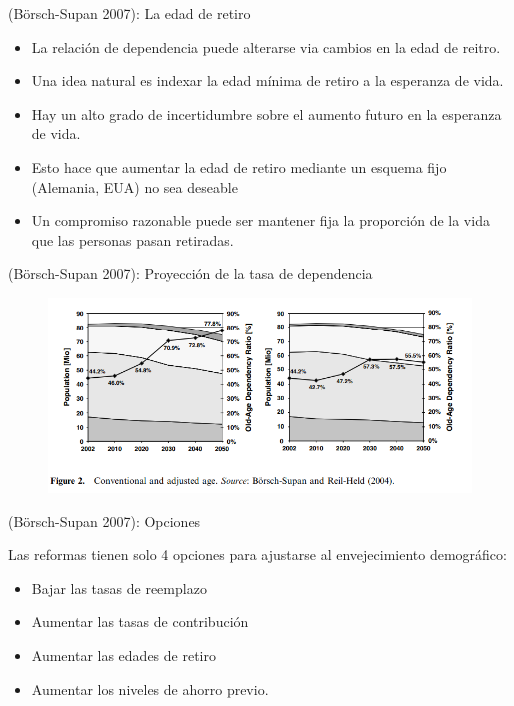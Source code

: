 \documentclass[ignorenonframetext,]{beamer}
\providecommand{\tightlist}{%
  \setlength{\itemsep}{0pt}\setlength{\parskip}{0pt}}
\begin{document}
\begin{frame}{(Börsch-Supan 2007): La edad de retiro}

\begin{itemize}
\item
  La relación de dependencia puede alterarse via cambios en la edad de
  reitro.
\item
  Una idea natural es indexar la edad mínima de retiro a la esperanza de
  vida.
\item
  Hay un alto grado de incertidumbre sobre el aumento futuro en la
  esperanza de vida.
\item
  Esto hace que aumentar la edad de retiro mediante un esquema fijo
  (Alemania, EUA) no sea deseable
\item
  Un compromiso razonable puede ser mantener fija la proporción de la
  vida que las personas pasan retiradas.
\end{itemize}

\end{frame}

\begin{frame}{(Börsch-Supan 2007): Proyección de la tasa de dependencia}

\begin{figure}
\centering
\includegraphics{imgs_reforma/borsch.png}
\caption{}
\end{figure}

\end{frame}

\begin{frame}{(Börsch-Supan 2007): Opciones}

Las reformas tienen solo 4 opciones para ajustarse al envejecimiento
demográfico:

\begin{itemize}
\tightlist
\item
  Bajar las tasas de reemplazo
\item
  Aumentar las tasas de contribución
\item
  Aumentar las edades de retiro
\item
  Aumentar los niveles de ahorro previo.
\end{itemize}

\end{frame}
\end{document}
